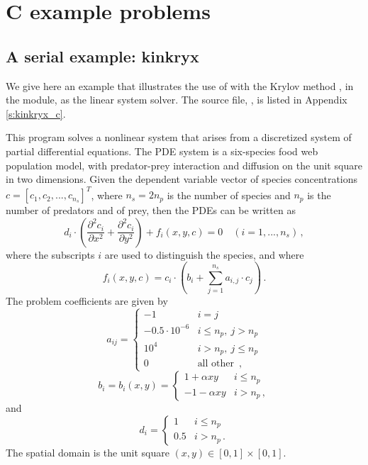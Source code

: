 \section{C example problems}\label{s:ex_c}

\subsection{A serial example: kinkryx}\label{ss:kinkryx}

We give here an example that illustrates the use of {\kinsol} with the Krylov
method {\spgmr}, in the {\kinspgmr} module, as the linear system solver.
The source file, , is listed in Appendix \ref{s:kinkryx_c}.

This program solves a nonlinear system that arises from a discretized system of partial
differential equations. The PDE system is a six-species food web population
model, with predator-prey interaction and diffusion on the unit square in
two dimensions. Given the dependent variable vector of species concentrations
$c = [c_1, c_2,..., c_{n_s}]^T$, where $n_s = 2 n_p$ is the number of species 
and $n_p$ is the number of predators and of prey, then
the PDEs can be written as
\begin{equation}\label{e:kinkryx_pde}
  d_i \cdot \left( \frac{\partial^2 c_i}{\partial x^2} + 
    \frac{\partial^2 c_i}{\partial y^2} \right) + f_i(x,y,c) = 0
  \quad (i=1,...,n_s) \, ,
\end{equation}
where the subscripts $i$ are used to distinguish the species, and where
\begin{equation}\label{e:kinkryx_fterm}
f_i(x,y,c) = c_i \cdot \left(b_i + \sum_{j=1}^{n_s} a_{i,j} \cdot c_j \right) \, .
\end{equation}
The problem coefficients are given by
\begin{equation*}
  a_{ij} = 
  \begin{cases}
    -1                 & i=j \\
    -0.5 \cdot 10^{-6} & i \leq n_p , ~ j > n_p  \\
    10^4               & i > n_p , ~ j \leq n_p  \\
    0                  & \mbox{all other } \, ,
  \end{cases}
\end{equation*}
\begin{equation*}
  b_i = b_i(x,y) = 
  \begin{cases}
    1 + \alpha xy   & i \leq n_p  \\
    -1 - \alpha xy   & i > n_p \, ,
  \end{cases}
\end{equation*}
and
\begin{equation*}
  d_i = 
  \begin{cases}
    1 & i \leq n_p  \\
    0.5 & i > n_p  \, .
  \end{cases}
\end{equation*}
The spatial domain is the unit square $(x,y) \in [0,1] \times [0,1]$.

